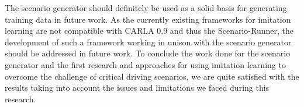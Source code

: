 \documentclass[conference, a4paper, 11pt]{IEEEtran}
\begin{document}
The scenario generator should definitely be used as a solid basis for generating training data in future work. As the currently existing frameworks for imitation learning are not compatible with CARLA 0.9 and thus the Scenario-Runner, the development of such a framework working in unison with the scenario generator should be addressed in future work.
To conclude the work done for the scenario generator and the first research and approaches for using imitation learning to overcome the challenge of critical driving scenarios, we are quite satisfied with the results taking into account the issues and limitations we faced during this research.

\printbibliography
\end{document}
